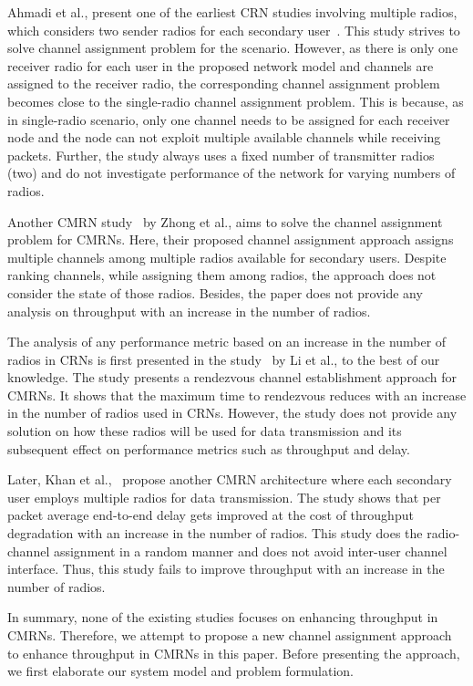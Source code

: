 \documentclass[letterpaper,conference]{IEEEtran}
\begin{document}
Ahmadi et al., present one of the earliest CRN studies involving multiple radios, which considers two sender radios for each secondary user~\cite{ahmadi2012distributed}. This study strives to solve channel assignment problem for the scenario. However, as there is only one receiver radio for each user in the proposed network model and channels are assigned to the receiver radio, the corresponding channel assignment problem becomes close to the single-radio channel assignment problem. This is because, as in single-radio scenario, only one channel needs to be assigned for each receiver node and the node can not exploit multiple available channels while receiving packets. Further, the study always uses a fixed number of transmitter radios (two) and do not investigate performance of the network for varying numbers of radios.

Another CMRN study~\cite{zhong2014capacity} by Zhong et al., aims to solve the channel assignment problem for CMRNs. Here, their proposed channel assignment approach assigns multiple channels among multiple radios available for secondary users. Despite ranking channels, while assigning them among radios, the approach does not consider the state of those radios. Besides, the paper does not provide any analysis on throughput with an increase in the number of radios.

The analysis of any performance metric based on an increase in the number of radios in CRNs is first presented in the study~\cite{li2014deterministic} by Li et al., to the best of our knowledge. The study presents a rendezvous channel establishment approach for CMRNs. It shows that the maximum time to rendezvous reduces with an increase in the number of radios used in CRNs. However, the study does not provide any solution on how these radios will be used for data transmission and its subsequent effect on performance metrics such as throughput and delay.

Later, Khan et al.,~\cite{khan2015towards} propose another CMRN architecture where each secondary user employs multiple radios for data transmission. The study shows that per packet average end-to-end delay gets improved at the cost of throughput degradation with an increase in the number of radios. This study does the radio-channel assignment in a random manner and does not avoid inter-user channel interface. Thus, this study fails to improve throughput with an increase in the number of radios.

In summary, none of the existing studies focuses on enhancing throughput in CMRNs. Therefore, we attempt to propose a new channel assignment approach to enhance throughput in CMRNs in this paper. Before presenting the approach, we first elaborate our system model and problem formulation.
\end{document}
